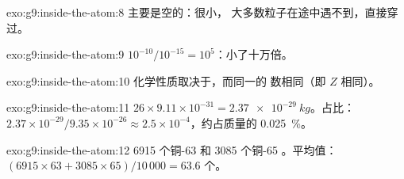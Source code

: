 \begin{solution}{exo:g9:inside-the-atom:8}
主要是空的：很小，
大多数粒子在途中遇不到，直接穿过。
\end{solution}

\begin{solution}{exo:g9:inside-the-atom:9}
$10^{-10} / 10^{-15} = 10^{5}$：小了十万倍。
\end{solution}

\begin{solution}{exo:g9:inside-the-atom:10}
化学性质取决于，而同一的
数相同（即 $Z$ 相同）。
\end{solution}

\begin{solution}{exo:g9:inside-the-atom:11}
$26 \times 9.11 \times 10^{-31} = \qty{2.37e-29}{kg}$。占比：
$2.37 \times 10^{-29} / 9.35 \times 10^{-26} \approx 2.5 \times
10^{-4}$，约占质量的 \qty{0.025}{\percent}。
\end{solution}

\begin{solution}{exo:g9:inside-the-atom:12}
6915 个铜-63 和 3085 个铜-65 。平均值：
$(6915 \times 63 + 3085 \times 65)/10\,000 = 63.6$ 个。
\end{solution}

